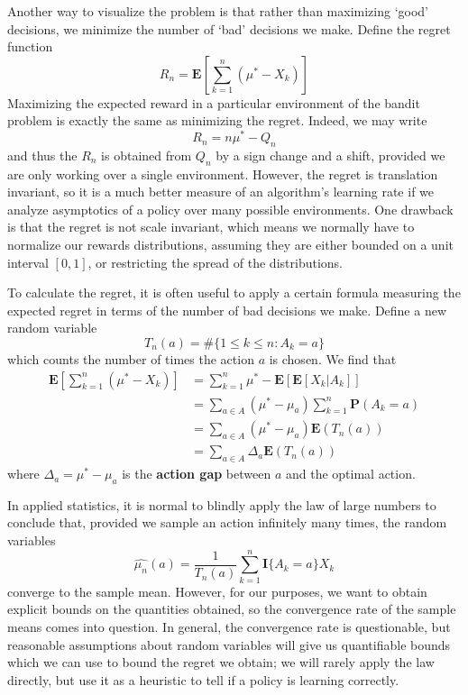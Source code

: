 Another way to visualize the problem is that rather than maximizing `good' decisions, we minimize the number of `bad' decisions we make. Define the regret function
%
\[ R_n = \mathbf{E} \left[\sum_{k = 1}^n (\mu^* - X_k) \right] \]
%
Maximizing the expected reward in a particular environment of the bandit problem is exactly the same as minimizing the regret. Indeed, we may write
%
\[ R_n = n \mu^* - Q_n  \]
%
and thus the $R_n$ is obtained from $Q_n$ by a sign change and a shift, provided we are only working over a single environment. However, the regret is translation invariant, so it is a much better measure of an algorithm's learning rate if we analyze asymptotics of a policy over many possible environments. One drawback is that the regret is not scale invariant, which means we normally have to normalize our rewards distributions, assuming they are either bounded on a unit interval $[0,1]$, or restricting the spread of the distributions.

To calculate the regret, it is often useful to apply a certain formula measuring the expected regret in terms of the number of bad decisions we make. Define a new random variable
%
\[ T_n(a) = \# \{ 1 \leq k \leq n : A_k = a \} \]
%
which counts the number of times the action $a$ is chosen. We find that
%
\begin{align*}
    \mathbf{E} \left[\sum_{k = 1}^n (\mu^* - X_k) \right] &= \sum_{k = 1}^n \mu^* - \mathbf{E}[ \mathbf{E}[X_k | A_k] ]\\
    &= \sum_{a \in A} (\mu^* - \mu_a) \sum_{k = 1}^n \mathbf{P}(A_k = a)\\
    &= \sum_{a \in A} (\mu^* - \mu_a) \mathbf{E}(T_n(a))\\
    &= \sum_{a \in A} \Delta_a \mathbf{E}(T_n(a))
\end{align*}
%
where $\Delta_a = \mu^* - \mu_a$ is the {\bf action gap} between $a$ and the optimal action.

In applied statistics, it is normal to blindly apply the law of large numbers to conclude that, provided we sample an action infinitely many times, the random variables
%
\[ \widehat{\mu_n}(a) = \frac{1}{T_n(a)} \sum_{k = 1}^n \mathbf{I} \{A_k = a \} X_k \]
%
converge to the sample mean. However, for our purposes, we want to obtain explicit bounds on the quantities obtained, so the convergence rate of the sample means comes into question. In general, the convergence rate is questionable, but reasonable assumptions about random variables will give us quantifiable bounds which we can use to bound the regret we obtain; we will rarely apply the law directly, but use it as a heuristic to tell if a policy is learning correctly.

